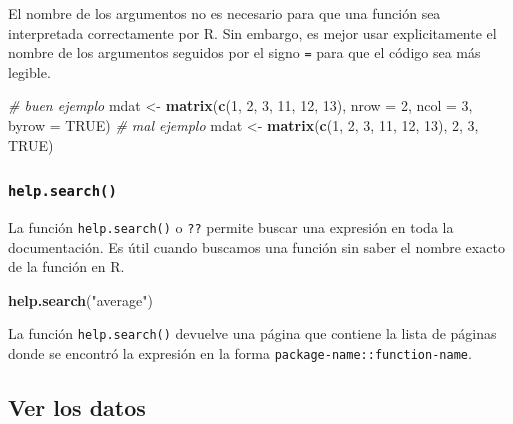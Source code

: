\documentclass[]{book}
\makeatletter
\newenvironment{Shaded}{\begin{snugshade}}{\end{snugshade}}
\newcommand{\KeywordTok}[1]{\textcolor[rgb]{0.13,0.29,0.53}{\textbf{#1}}}
\newcommand{\DataTypeTok}[1]{\textcolor[rgb]{0.13,0.29,0.53}{#1}}
\newcommand{\DecValTok}[1]{\textcolor[rgb]{0.00,0.00,0.81}{#1}}
\newcommand{\StringTok}[1]{\textcolor[rgb]{0.31,0.60,0.02}{#1}}
\newcommand{\CommentTok}[1]{\textcolor[rgb]{0.56,0.35,0.01}{\textit{#1}}}
\newcommand{\OtherTok}[1]{\textcolor[rgb]{0.56,0.35,0.01}{#1}}
\newcommand{\NormalTok}[1]{#1}
\newenvironment{kframe}{%
\medskip{}
\setlength{\fboxsep}{.8em}
 \def\at@end@of@kframe{}%
 \ifinner\ifhmode%
  \def\at@end@of@kframe{\end{minipage}}%
  \begin{minipage}{\columnwidth}%
 \fi\fi%
 \def\FrameCommand##1{\hskip\@totalleftmargin \hskip-\fboxsep
 \colorbox{shadecolor}{##1}\hskip-\fboxsep
     \hskip-\linewidth \hskip-\@totalleftmargin \hskip\columnwidth}%
 \MakeFramed {\advance\hsize-\width
   \@totalleftmargin\z@ \linewidth\hsize
   \@setminipage}}%
 {\par\unskip\endMakeFramed%
 \at@end@of@kframe}
\newenvironment{rmdblock}[1]
  {
  \begin{itemize}
  \renewcommand{\labelitemi}{
    \raisebox{-.7\height}[0pt][0pt]{
      {\setkeys{Gin}{width=3em,keepaspectratio}\texttt{[image: myIcons/\#1]}} %
    }
  }
  \setlength{\fboxsep}{1em}
  \begin{kframe}
  \item
  }
  {
  \end{kframe}
  \end{itemize}
  }
\newenvironment{rmdstyle}     %
  {\begin{rmdblock}{style}}   %
  {\end{rmdblock}}            %
\makeatother
\begin{document}
\begin{rmdstyle}
El nombre de los argumentos no es necesario para que una función sea
interpretada correctamente por R. Sin embargo, es mejor usar
explicitamente el nombre de los argumentos seguidos por el signo
\texttt{=} para que el código sea más legible.
\end{rmdstyle}

\begin{Shaded}
\begin{Highlighting}[]
\CommentTok{# buen ejemplo}
\NormalTok{mdat <-}\StringTok{ }\KeywordTok{matrix}\NormalTok{(}\KeywordTok{c}\NormalTok{(}\DecValTok{1}\NormalTok{, }\DecValTok{2}\NormalTok{, }\DecValTok{3}\NormalTok{, }\DecValTok{11}\NormalTok{, }\DecValTok{12}\NormalTok{, }\DecValTok{13}\NormalTok{), }\DataTypeTok{nrow =} \DecValTok{2}\NormalTok{, }\DataTypeTok{ncol =} \DecValTok{3}\NormalTok{, }\DataTypeTok{byrow =} \OtherTok{TRUE}\NormalTok{)}
\CommentTok{# mal ejemplo}
\NormalTok{mdat <-}\StringTok{ }\KeywordTok{matrix}\NormalTok{(}\KeywordTok{c}\NormalTok{(}\DecValTok{1}\NormalTok{, }\DecValTok{2}\NormalTok{, }\DecValTok{3}\NormalTok{, }\DecValTok{11}\NormalTok{, }\DecValTok{12}\NormalTok{, }\DecValTok{13}\NormalTok{), }\DecValTok{2}\NormalTok{, }\DecValTok{3}\NormalTok{, }\OtherTok{TRUE}\NormalTok{)}
\end{Highlighting}
\end{Shaded}

\subsubsection{\texorpdfstring{\texttt{help.search()}}{help.search()}}\label{l015helpsearch}

La función \texttt{help.search()} o \texttt{??} permite buscar una
expresión en toda la documentación. Es útil cuando buscamos una función
sin saber el nombre exacto de la función en R.

\begin{Shaded}
\begin{Highlighting}[]
\KeywordTok{help.search}\NormalTok{(}\StringTok{"average"}\NormalTok{)}
\end{Highlighting}
\end{Shaded}

La función \texttt{help.search()} devuelve una página que contiene la
lista de páginas donde se encontró la expresión en la forma
\texttt{package-name::function-name}.

\subsection{Ver los datos}\label{ver-los-datos}
\end{document}
